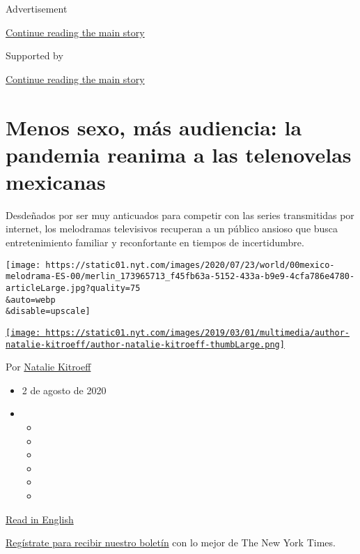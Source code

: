 Advertisement

\protect\hyperlink{after-top}{Continue reading the main story}

Supported by

\protect\hyperlink{after-sponsor}{Continue reading the main story}

\hypertarget{menos-sexo-muxe1s-audiencia-la-pandemia-reanima-a-las-telenovelas-mexicanas}{%
\section{Menos sexo, más audiencia: la pandemia reanima a las
telenovelas
mexicanas}\label{menos-sexo-muxe1s-audiencia-la-pandemia-reanima-a-las-telenovelas-mexicanas}}

Desdeñados por ser muy anticuados para competir con las series
transmitidas por internet, los melodramas televisivos recuperan a un
público ansioso que busca entretenimiento familiar y reconfortante en
tiempos de incertidumbre.

\texttt{[image: https://static01.nyt.com/images/2020/07/23/world/00mexico-melodrama-ES-00/merlin\_173965713\_f45fb63a-5152-433a-b9e9-4cfa786e4780-articleLarge.jpg?quality=75\\\&auto=webp\\\&disable=upscale]}

\href{https://www.nytimes.com/by/natalie-kitroeff}{\texttt{[image: https://static01.nyt.com/images/2019/03/01/multimedia/author-natalie-kitroeff/author-natalie-kitroeff-thumbLarge.png]}}

Por \href{https://www.nytimes.com/by/natalie-kitroeff}{Natalie Kitroeff}

\begin{itemize}
\item
  2 de agosto de 2020
\item
  \begin{itemize}
  \item
  \item
  \item
  \item
  \item
  \item
  \end{itemize}
\end{itemize}

\href{https://www.nytimes.com/2020/08/02/world/americas/mexico-tv-virus-telenovela.html}{Read
in English}

\href{https://www.nytimes.com/newsletters/el-times}{Regístrate para
recibir nuestro boletín} con lo mejor de The New York Times.

